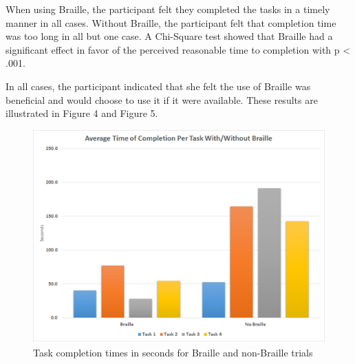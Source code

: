 \documentclass[11.5pt]{sig-alternate} %
\begin{document}
\begin{large}
When using Braille, the participant felt they completed the tasks in a timely manner in all cases. Without Braille, the participant felt that completion time was too long in all but one case. A Chi-Square test showed that Braille had a significant effect in favor of the perceived reasonable time to completion with p < .001.

In all cases, the participant indicated that she felt the use of Braille was beneficial and would choose to use it if it were available. These results are illustrated in Figure 4 and Figure 5.

\begin{figure}[!h]
    \centering
    \includegraphics[width=1\linewidth]{images/fig4.png}
    \caption{Task completion times in seconds for Braille and non-Braille trials}
\end{figure}


\end{large}
\end{document}
